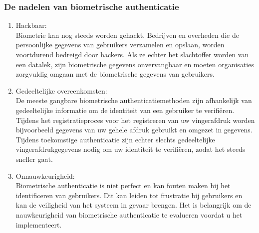 \subsubsection{De nadelen van biometrische authenticatie}%
\label{subsubsec:de-nadelen-van-biometrische-authenticatie}
\begin{enumerate}[label=\textbf{-}]
  \item Hackbaar: \\
  Biometrie kan nog steeds worden gehackt. Bedrijven en overheden die de persoonlijke gegevens van gebruikers verzamelen en opslaan, worden voortdurend bedreigd door hackers. Als ze echter het slachtoffer worden van een datalek, zijn biometrische gegevens onvervangbaar en moeten organisaties zorgvuldig omgaan met de biometrische gegevens van gebruikers.

  \item Gedeeltelijke overeenkomsten: \\
  De meeste gangbare biometrische authenticatiemethoden zijn afhankelijk van gedeeltelijke informatie om de identiteit van een gebruiker te verifiëren. Tijdens het registratieproces voor het registreren van uw vingerafdruk worden bijvoorbeeld gegevens van uw gehele afdruk gebruikt en omgezet in gegevens. Tijdens toekomstige authenticatie zijn echter slechts gedeeltelijke vingerafdrukgegevens nodig om uw identiteit te verifiëren, zodat het steeds sneller gaat.

  \item Onnauwkeurigheid: \\
  Biometrische authenticatie is niet perfect en kan fouten maken bij het identificeren van gebruikers. Dit kan leiden tot frustratie bij gebruikers en kan de veiligheid van het systeem in gevaar brengen. Het is belangrijk om de nauwkeurigheid van biometrische authenticatie te evalueren voordat u het implementeert.
\end{enumerate}


